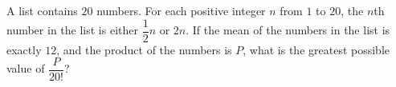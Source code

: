 A list contains $20$ numbers. For each positive integer $n$ from $1$ to $20$, the $n$th number in the list is either $\dfrac{1}{2}n$ or $2n$. If the mean of the numbers in the list is exactly $12$, and the product of the numbers is $P$, what is the greatest possible value of $\dfrac{P}{20!}$?
